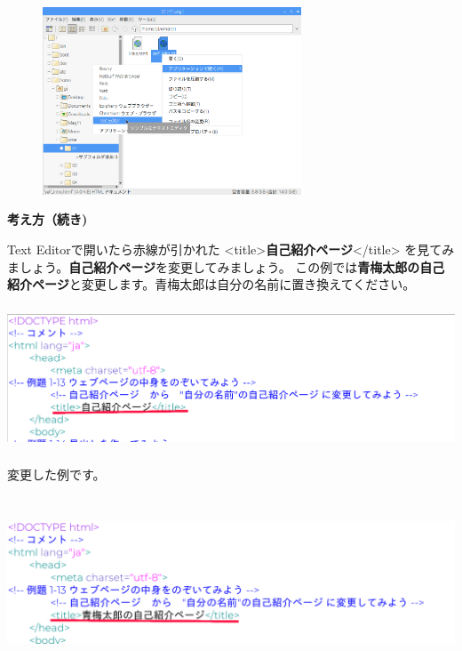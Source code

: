 \documentclass[a4paper,12pt]{jarticle}
\begin{document}
\begin{figure}[ht]
\begin{minipage}{\textwidth}
    \includegraphics[width=7.701cm,height=5.577cm]{textbook-img145.png}


    \bigskip
  \end{minipage}


\end{figure}

\clearpage
\textbf{考え方（続き)}

Text Editorで開いたら赤線が引かれた
{\textless}title{\textgreater}\textbf{自己紹介ページ}{\textless}/title{\textgreater}
を見てみましょう。\textbf{自己紹介ページ}を変更してみましょう。
この例では\textbf{青梅太郎の自己紹介ページ}と変更します。青梅太郎は自分の名前に置き換えてください。


\centering
\includegraphics[width=16.316cm,height=4.29cm]{textbook-img146.png}



\bigskip

\flushleft
変更した例です。

\centering
\includegraphics[width=16.198cm,height=5.145cm]{textbook-img148.png}
\end{document}

